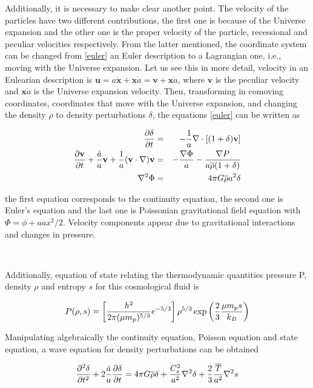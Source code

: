 Additionally, it is necessary to make clear another point. The velocity of the particles have 
two different contributions, the first one is because of the Universe expansion and 
the other one is the proper velocity of the particle, recessional 
and peculiar velocities respectively. 
From the latter mentioned, the coordinate system can be changed from \ref{euler}
an Euler description to a Lagrangian one, i.e., moving with the Universe expansion.
Let us see this in more detail, velocity in an Eulearian description is 
$\textbf{u}= a\dot{\textbf{x}}+ \textbf{x}\dot{a} = \textbf{v}+\textbf{x}\dot{a}$, 
where $\textbf{v}$ is the peculiar velocity and $\textbf{x}\dot{a}$ is the Universe 
expansion velocity. 
Then, transforming in comoving coordinates, coordinates that move with the Universe
expansion, and changing the density $\rho$ to density perturbations $\delta$, the equations 
\ref{euler} can be written as 

\begin{eqnarray}
\frac{\partial \delta}{\partial t} &=& -\frac{1}{a}\nabla\cdot[(1+\delta)\textbf{v}]\nonumber\\
\frac{\partial \textbf{v}}{\partial t}+\frac{\dot{a}}{a}\textbf{v}+\frac{1}{a}(\textbf{v}\cdot\nabla)\textbf{v}& = &
-\frac{\nabla \Phi}{a}-\frac{\nabla P}{a\overline{\rho}(1+\delta)}\nonumber\\
\nabla^2 \Phi &=& 4\pi G\overline{\rho}a^2\delta
\label{ec.movimiento}
\end{eqnarray}

the first equation corresponds to the continuity equation, the second one is Euler's 
equation and the last one is Poissonian gravitational field equation with $\Phi = \phi +a\ddot{a}x^2/2$. Velocity components appear due to gravitational interactions and changes in pressure.

\

Additionally, equation of state relating the thermodynamic quantities pressure P, 
density $\rho$ and entropy $s$ for this cosmological fluid is 

\begin{equation}
P(\rho,s)= \left[\frac{h^2}{2\pi(\mu m_p)^{5/3}}e^{-5/3}\right]\rho^{5/3}\exp \left(\frac{2}{3}\frac{\mu m_ps}{k_B}\right)
\label{ec.estado}
\end{equation}

Manipulating algebraically the continuity equation, Poisson equation and state equation,
a wave equation for density perturbations can be obtained

\begin{equation}
\frac{\partial^2\delta}{\partial t^2}+2\frac{\dot{a}}{a}\frac{\partial \delta}{\partial t} =
4\pi G \overline{\rho}\delta + \frac{C_s^2}{a^2}\nabla^2\delta+\frac{2}{3}\frac{\overline{T}}{a^2}\nabla^2s
\label{onda}
\end{equation}

